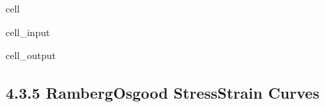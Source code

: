\documentclass[letterpaper,10pt,english]{jupyterBook}
\begin{document}
\begin{sphinxuseclass}{cell}
\begin{sphinxVerbatimInput}
\begin{sphinxuseclass}{cell_input}
		\end{sphinxuseclass}\end{sphinxVerbatimInput}
		\begin{sphinxVerbatimOutput}
			
			\begin{sphinxuseclass}{cell_output}
				\noindent{}
				
		\end{sphinxuseclass}\end{sphinxVerbatimOutput}
		
	\end{sphinxuseclass}
	
	\subsection{4.3.5 Ramberg\sphinxhyphen{}Osgood Stress\sphinxhyphen{}Strain Curves}
	\label{\detokenize{4 Mechanical Properties:ramberg-osgood-stress-strain-curves}}
\end{document}
